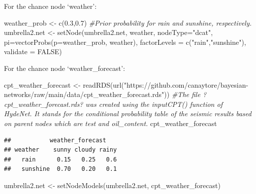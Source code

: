 \documentclass[
]{article}
\newenvironment{Shaded}{\begin{snugshade}}{\end{snugshade}}
\newcommand{\AttributeTok}[1]{\textcolor[rgb]{0.77,0.63,0.00}{#1}}
\newcommand{\CommentTok}[1]{\textcolor[rgb]{0.56,0.35,0.01}{\textit{#1}}}
\newcommand{\ConstantTok}[1]{\textcolor[rgb]{0.00,0.00,0.00}{#1}}
\newcommand{\FloatTok}[1]{\textcolor[rgb]{0.00,0.00,0.81}{#1}}
\newcommand{\FunctionTok}[1]{\textcolor[rgb]{0.00,0.00,0.00}{#1}}
\newcommand{\NormalTok}[1]{#1}
\newcommand{\OtherTok}[1]{\textcolor[rgb]{0.56,0.35,0.01}{#1}}
\newcommand{\StringTok}[1]{\textcolor[rgb]{0.31,0.60,0.02}{#1}}
\begin{document}
For the chance node `weather':

\begin{Shaded}
\begin{Highlighting}[]
\NormalTok{weather\_prob }\OtherTok{\textless{}{-}} \FunctionTok{c}\NormalTok{(}\FloatTok{0.3}\NormalTok{,}\FloatTok{0.7}\NormalTok{) }\CommentTok{\#Prior probability for rain and sunshine, respectively.}
\NormalTok{umbrella2.net }\OtherTok{\textless{}{-}} \FunctionTok{setNode}\NormalTok{(umbrella2.net, weather, }\AttributeTok{nodeType=}\StringTok{"dcat"}\NormalTok{, }\AttributeTok{pi=}\FunctionTok{vectorProbs}\NormalTok{(}\AttributeTok{p=}\NormalTok{weather\_prob, weather), }\AttributeTok{factorLevels =} \FunctionTok{c}\NormalTok{(}\StringTok{"rain"}\NormalTok{,}\StringTok{"sunshine"}\NormalTok{), }\AttributeTok{validate =} \ConstantTok{FALSE}\NormalTok{)}
\end{Highlighting}
\end{Shaded}

For the chance node `weather\_forecast':

\begin{Shaded}
\begin{Highlighting}[]
\NormalTok{cpt\_weather\_forecast }\OtherTok{\textless{}{-}} \FunctionTok{readRDS}\NormalTok{(}\FunctionTok{url}\NormalTok{(}\StringTok{"https://github.com/canaytore/bayesian{-}networks/raw/main/data/cpt\_weather\_forecast.rds"}\NormalTok{))}
\CommentTok{\#The file ?cpt\_weather\_forecast.rds? was created using the inputCPT() function of HydeNet. It stands for the conditional probability table of the seismic results based on parent nodes which are \textquotesingle{}test\textquotesingle{} and \textquotesingle{}oil\_content\textquotesingle{}.}
\NormalTok{cpt\_weather\_forecast}
\end{Highlighting}
\end{Shaded}

\begin{verbatim}
##           weather_forecast
## weather    sunny cloudy rainy
##   rain      0.15   0.25   0.6
##   sunshine  0.70   0.20   0.1
\end{verbatim}

\begin{Shaded}
\begin{Highlighting}[]
\NormalTok{umbrella2.net }\OtherTok{\textless{}{-}} \FunctionTok{setNodeModels}\NormalTok{(umbrella2.net, cpt\_weather\_forecast)}
\end{Highlighting}
\end{Shaded}
\end{document}
